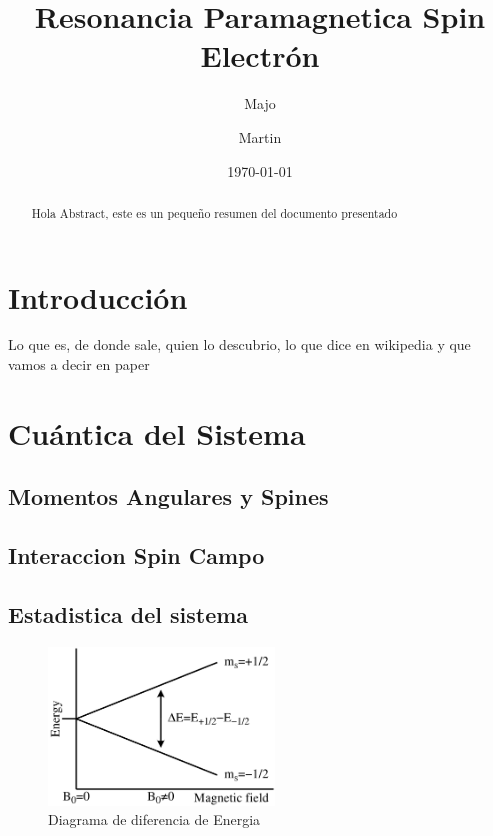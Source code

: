 \documentclass[twocolumn,amssymb,prb,aps,superscriptaddress]{revtex4}
\begin{document}
\begin{abstract}
    Hola Abstract, este es un pequeño resumen del documento presentado
\end{abstract}

\title{Resonancia Paramagnetica Spin Electrón}
\author{Majo}


\author{Martin}


\date{\today}

\maketitle

\section[Intro]{Introducción}
\label{sec:intro}

Lo que es, de donde sale, quien lo descubrio, lo que dice en wikipedia y que vamos a decir en paper

\section[]{Cuántica del Sistema}
\label{sec:cuantica}

\subsection{Momentos Angulares y Spines}
\label{sec:momentosAngulares}

\subsection{Interaccion Spin Campo}

\subsection{Estadistica del sistema}
\label{mecanicaEstadistica}

    \begin{figure}[H]
        \centering
        \includegraphics[width=6.0cm]{images/EPR_splitting}
        \caption{Diagrama de diferencia de Energia}
        \label{fig:diagramaDiferenciaDeEnergia} 
    \end{figure}
\end{document}
